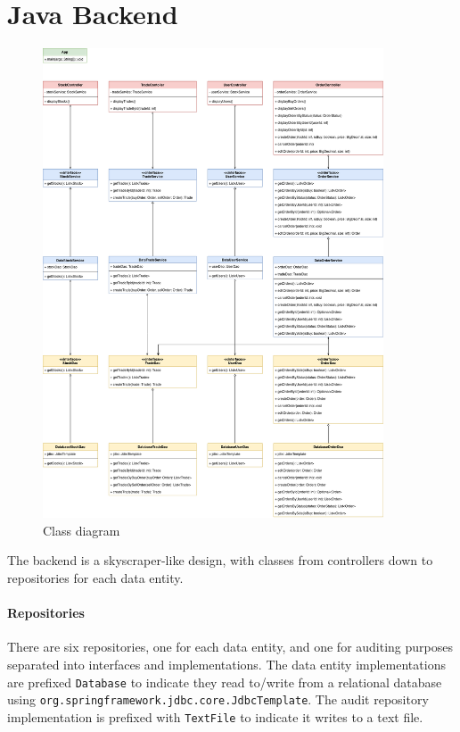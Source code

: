 \documentclass{article}
\begin{document}
\section{Java Backend}

\begin{figure}[h]
    \centering
    \includegraphics[width=0.9\textwidth]{class-diagram.png}
    \caption{Class diagram}
\end{figure}

The backend is a skyscraper-like design, with classes from controllers down to repositories for each data entity.

\paragraph{Repositories} There are six repositories, one for each data entity, and one for auditing purposes separated into interfaces and implementations. The data entity implementations are prefixed \texttt{Database} to indicate they read to/write from a relational database using \texttt{org.springframework.jdbc.core.JdbcTemplate}. The audit repository implementation is prefixed with \texttt{TextFile} to indicate it writes to a text file.
\end{document}
